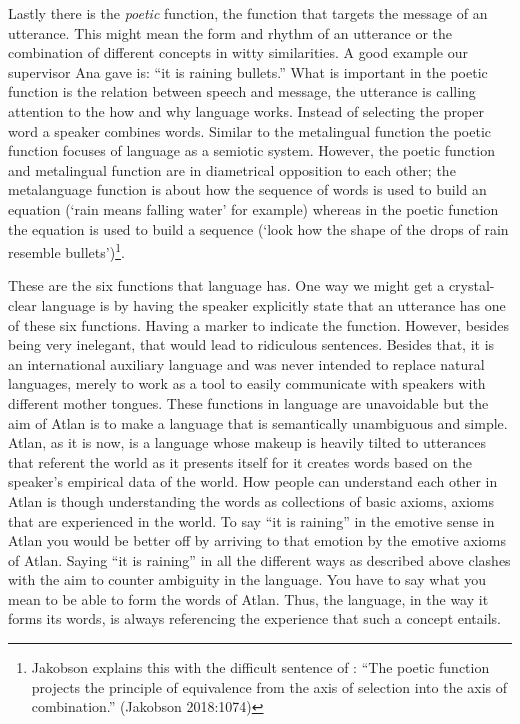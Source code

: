 Lastly there is the \textit{poetic} function, the function that targets the message of an utterance. This might mean the form and rhythm of an utterance or the combination of different concepts in witty similarities. A good example our supervisor Ana gave is: “it is raining bullets.” What is important in the poetic function is the relation between speech and message, the utterance is calling attention to the how and why language works\footnotemark. Instead of selecting the proper word a speaker combines words. Similar to the metalingual function the poetic function focuses of language as a semiotic system. However, the poetic function and metalingual function are in diametrical opposition to each other; the metalanguage function is about how the sequence of words is used to build an equation (‘rain means falling water’ for example) whereas in the poetic function the equation is used to build a sequence (‘look how the shape of the drops of rain resemble bullets’)\footnote{Jakobson explains this with the difficult sentence of : “The poetic function projects the principle of equivalence from the axis of selection into the axis of combination.” (Jakobson 2018:1074)}.


These are the six functions that language has. One way we might get a crystal-clear language is by having the speaker explicitly state that an utterance has one of these six functions. Having a marker to indicate the function. However, besides being very inelegant, that would lead to ridiculous sentences. Besides that, it is an international auxiliary language and was never intended to replace natural languages, merely to work as a tool to easily communicate with speakers with different mother tongues. These functions in language are unavoidable but the aim of Atlan is to make a language that is semantically unambiguous and simple. Atlan, as it is now, is a language whose makeup is heavily tilted to utterances that referent the world as it presents itself for it creates words based on the speaker's empirical data of the world. How people can understand each other in Atlan is though understanding the words as collections of basic axioms, axioms that are experienced in the world. To say “it is raining” in the emotive sense in Atlan you would be better off by arriving to that emotion by the emotive axioms of Atlan. Saying “it is raining” in all the different ways as described above clashes with the aim to counter ambiguity in the language. You have to say what you mean to be able to form the words of Atlan. Thus, the language, in the way it forms its words, is always referencing the experience that such a concept entails.   

